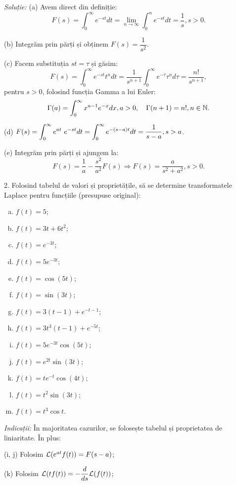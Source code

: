 \emph{Soluție:} (a) Avem direct din definiție:
\[
  F(s) = \int_0^\infty e^{-st} dt = \lim_{n \to \infty} \int_0^n e^{-st} dt = \frac{1}{s}, s > 0.
\]

(b) Integrăm prin părți și obținem $ F(s) = \dfrac{1}{s^2} $.

(c) Facem substituția $ st = \tau $ și găsim:
\[
  F(s) = \int_0^\infty e^{-st} t^n dt = \frac{1}{s^{n+1}} \int_0^\infty e^{-\tau} \tau^n d\tau = %
  \frac{n!}{s^{n+1}},
\]
pentru $ s > 0 $, folosind funcția Gamma a lui Euler:
\[
  \Gamma(a) = \int_0^\infty x^{a-1}e^{-x} dx, a > 0, \quad \Gamma(n + 1) = n!, n \in \mathbb{N}.
\]

(d) $ F(s) = \ds\int_0^\infty e^{at} e^{-st} dt = \ds\int_0^\infty e^{-(s - a)t} dt = %
\dfrac{1}{s-a}, s > a $.

(e) Integrăm prin părți și ajungem la:
\[
  F(s) = \frac{1}{a} - \frac{s^2}{a^2} F(s) \Rightarrow F(s) = \frac{a}{s^2 + a^2}, s > 0.
\]

\vspace{1cm}

2. Folosind tabelul de valori și proprietățile, să se determine transformatele Laplace
pentru funcțiile (presupuse original):
\begin{enumerate}[(a)]
\item $ f(t) = 5 $;
\item $ f(t) = 3t + 6t^2 $;
\item $ f(t) = e^{-3t} $;
\item $ f(t) = 5e^{-3t} $;
\item $ f(t) = \cos (5t) $;
\item $ f(t) = \sin (3t) $;
\item $ f(t) = 3(t-1) + e^{-t-1} $;
\item $ f(t) = 3t^3(t - 1) + e^{-5t} $;
\item $ f(t) = 5e^{-3t} \cos (5t) $;
\item $ f(t) = e^{2t} \sin (3t) $;
\item $ f(t) = te^{-t} \cos (4t) $;
\item $ f(t) = t^2 \sin (3t) $;
\item $ f(t) = t^3 \cos t $.
\end{enumerate}

\emph{Indicații:} În majoritatea cazurilor, se folosește tabelul și proprietatea de liniaritate.
În plus:

(i, j) Folosim $ \mathcal{L} (e^{at} f(t)) = F(s - a) $;

(k) Folosim $ \mathcal{L} (t f(t)) = -\dfrac{d}{ds} \mathcal{L}(f(t)) $;

